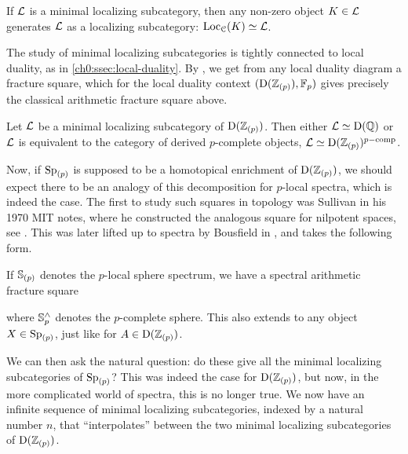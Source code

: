 \begin{remark}
    If $\L$ is a minimal localizing subcategory, then any non-zero object $K\in \L$ generates $\L$ as a localizing subcategory: $\Loc_\C(K)\simeq \L$.
\end{remark}

The study of minimal localizing subcategories is tightly connected to local duality, as in \cref{ch0:ssec:local-duality}. By \cite[2.26]{barthel-heard-valenzuela_2018}, we get from any local duality diagram a fracture square, which for the local duality context $(\Der(\Z_{(p)}), \F_p)$ gives precisely the classical arithmetic fracture square above. 

\begin{proposition}
    Let $\L$ be a minimal localizing subcategory of $\Der(\Z_{(p)})$. Then either $\L \simeq \Der(\Q)$ or $\L$ is equivalent to the category of derived $p$-complete objects, $\L\simeq \Der(\Z_{(p)})^{p-\mathrm{comp}}$.
\end{proposition}

Now, if $\Sp_{(p)}$ is supposed to be a homotopical enrichment of $\Der(\Z_{(p)})$, we should expect there to be an analogy of this decomposition for $p$-local spectra, which is indeed the case. The first to study such squares in topology was Sullivan in his 1970 MIT notes, where he constructed the analogous square for nilpotent spaces, see \cite[3.20]{sullivan_05}. This was later lifted up to spectra by Bousfield in \cite[2.9]{bousfield_1979_localization}, and takes the following form. 

If $\S_{(p)}$ denotes the $p$-local sphere spectrum, we have a spectral arithmetic fracture square

\begin{center}
\end{center}

where $\S_p^\wedge$ denotes the $p$-complete sphere. This also extends to any object $X\in \Sp_{(p)}$, just like for $A\in \Der(\Z_{(p)})$. 

We can then ask the natural question: do these give all the minimal localizing subcategories of $\Sp_{(p)}$? This was indeed the case for $\Der(\Z_{(p)})$, but now, in the more complicated world of spectra, this is no longer true. We now have an infinite sequence of minimal localizing subcategories, indexed by a natural number $n$, that ``interpolates'' between the two minimal localizing subcategories of $\Der(\Z_{(p)})$. 

